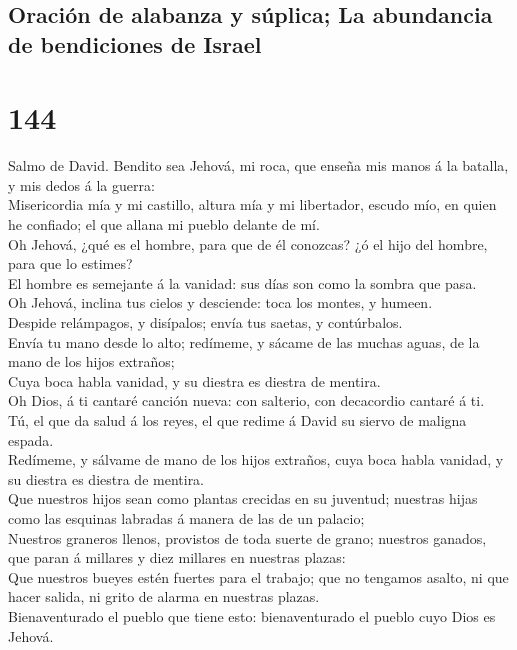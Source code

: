 \hypertarget{oraciuxf3n-de-alabanza-y-suxfaplica-la-abundancia-de-bendiciones-de-israel}{%
\subsection{Oración de alabanza y súplica; La abundancia de bendiciones
de
Israel}\label{oraciuxf3n-de-alabanza-y-suxfaplica-la-abundancia-de-bendiciones-de-israel}}

\hypertarget{section-143}{%
\section{144}\label{section-143}}

 Salmo de David. Bendito sea Jehová, mi roca, que enseña
mis manos á la batalla, y mis dedos á la guerra:\\
 Misericordia mía y mi castillo, altura mía y mi
libertador, escudo mío, en quien he confiado; el que allana mi pueblo
delante de mí.\\
 Oh Jehová, ¿qué es el hombre, para que de él conozcas? ¿ó
el hijo del hombre, para que lo estimes?\\
 El hombre es semejante á la vanidad: sus días son como la
sombra que pasa.\\
 Oh Jehová, inclina tus cielos y desciende: toca los
montes, y humeen.\\
 Despide relámpagos, y disípalos; envía tus saetas, y
contúrbalos.\\
 Envía tu mano desde lo alto; redímeme, y sácame de las
muchas aguas, de la mano de los hijos extraños;\\
 Cuya boca habla vanidad, y su diestra es diestra de
mentira.\\
 Oh Dios, á ti cantaré canción nueva: con salterio, con
decacordio cantaré á ti.\\
 Tú, el que da salud á los reyes, el que redime á David
su siervo de maligna espada.\\
 Redímeme, y sálvame de mano de los hijos extraños, cuya
boca habla vanidad, y su diestra es diestra de mentira.\\
 Que nuestros hijos sean como plantas crecidas en su
juventud; nuestras hijas como las esquinas labradas á manera de las de
un palacio;\\
 Nuestros graneros llenos, provistos de toda suerte de
grano; nuestros ganados, que paran á millares y diez millares en
nuestras plazas:\\
 Que nuestros bueyes estén fuertes para el trabajo; que
no tengamos asalto, ni que hacer salida, ni grito de alarma en nuestras
plazas.\\
 Bienaventurado el pueblo que tiene esto: bienaventurado
el pueblo cuyo Dios es Jehová.

